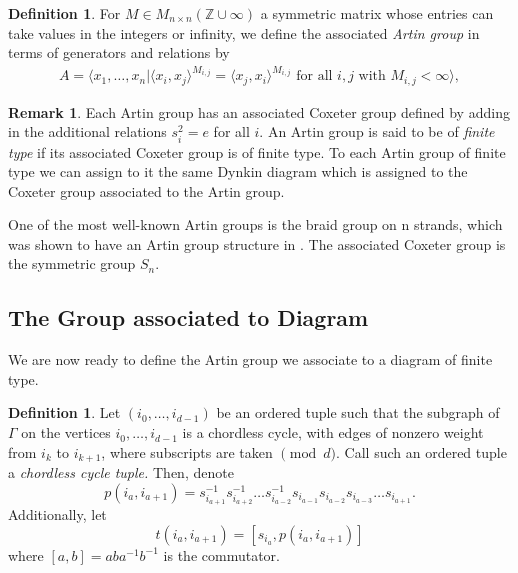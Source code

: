 \documentclass[11pt]{amsart}
\theoremstyle{definition}
\newtheorem{defn}[thm]{Definition}
\newtheorem{rem}[thm]{Remark}
\begin{document}
\begin{defn}
\cite[Beginning of section 1.2]{C06}
For $M \in M_{n \times n}(\mathbb Z \cup \infty)$ a symmetric matrix whose entries can take values in the integers or infinity, we define the associated {\it Artin group} in terms of generators and relations by
\begin{align*}
A = \langle x_1,\ldots, x_n| \langle x_i,x_j \rangle^{M_{i,j}} = \langle x_j,x_i \rangle^{M_{i,j}} \text{ for all } i,j \text{ with } M_{i,j}<\infty \rangle,
\end{align*}
\end{defn}

\begin{rem}
Each Artin group has an associated Coxeter group defined by adding in the additional relations $s_i^2 = e$ for all $i.$ An Artin group is said to be of {\it finite type} if its associated Coxeter group is of finite type. To each Artin group of finite type we can assign to it the same Dynkin diagram which is assigned to the Coxeter group associated to the Artin group.
\end{rem}

One of the most well-known Artin groups is the braid group on n strands, which was shown to have an Artin group structure in \cite{FN61}. The associated Coxeter group is the symmetric group $S_{n}$.

\subsection{The Group associated to Diagram}

We are now ready to define the Artin group we associate to a diagram of finite type.

\begin{defn}
\label{defn:cycle_tuple}
Let $(i_0,\ldots, i_{d-1})$ be an ordered tuple such that the subgraph of $\Gamma$ on the vertices $i_0,\ldots, i_{d-1}$ is a chordless cycle, with edges of nonzero weight from $i_k$ to $i_{k+1}$, where subscripts are taken $\pmod d.$ Call such an ordered tuple a {\it chordless cycle tuple.} Then, denote $$p(i_a,i_{a+1}) = s_{i_{a+1}}^{-1}s_{i_{a+2}}^{-1}\dots s_{i_{a-2}}^{-1}s_{i_{a-1}}s_{i_{a-2}}s_{i_{a-3}}\dots s_{i_{a+1}}.$$ Additionally, let $$t(i_a,i_{a+1}) = [s_{i_a},p(i_a,i_{a+1})]$$ where $[a,b] = aba^{-1}b^{-1}$ is the commutator.
\end{defn}
\end{document}
